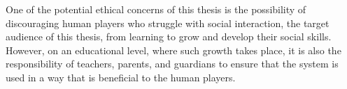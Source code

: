 One of the potential ethical concerns of this thesis is the possibility of
discouraging human players who struggle with social interaction, the target
audience of this thesis, from learning to grow and develop their social skills.
However, on an educational level, where such growth takes place, it is
also the responsibility of teachers, parents, and guardians to ensure that the
system is used in a way that is beneficial to the human players.
